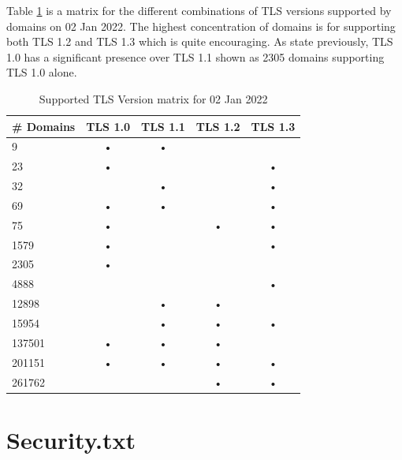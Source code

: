 \documentclass{mscreport}
\begin{document}
\vspace{0.3cm} \noindent
Table \ref{table:tls_supported_matrix} is a matrix for the different combinations of TLS versions supported by domains on 02 Jan 2022. The highest concentration of domains is for supporting both TLS 1.2 and TLS 1.3 which is quite encouraging. As state previously, TLS 1.0 has a significant presence over TLS 1.1 shown as 2305 domains supporting TLS 1.0 alone.

\begin{table}[t]
  \begin{center}
    \begin{tabular}{|l|c|c|c|c|}  %
      \hline
      \textbf{\# Domains} & \textbf{TLS 1.0} & \textbf{TLS 1.1} & \textbf{TLS 1.2} & \textbf{TLS 1.3} \\
      \hline
      9      & • & • &  & \\
	  \hline
      23     & • &  &  & •\\
	  \hline
      32     &   & • &   & •\\
	  \hline
      69     & • & • &   & •\\
	  \hline
      75     & • &   & • & •\\
	  \hline
      1579   & • &   &   & •\\
	  \hline
      2305   & • &   &   &  \\
	  \hline
      4888   &   &   &   & •\\
	  \hline
      12898  &   & • & • &  \\
	  \hline
      15954  &   & • & • & •\\
	  \hline
      137501 & • & • & • &  \\
	  \hline
      201151 & • & • & • & •\\
	  \hline
      261762 &   &   & • & •\\
	  \hline
    \end{tabular}
    \caption{Supported TLS Version matrix for 02 Jan 2022}
    \label{table:tls_supported_matrix} %
  \end{center}
\end{table}

\clearpage
\newpage


\section{Security.txt}
\label{section:security_txt}
\end{document}
